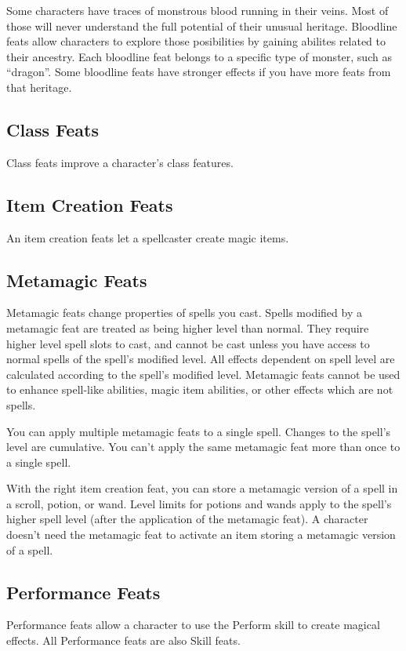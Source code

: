 Some characters have traces of monstrous blood running in their veins.
Most of those will never understand the full potential of their unusual heritage.
Bloodline feats allow characters to explore those posibilities by gaining abilites related to their ancestry.
Each bloodline feat belongs to a specific type of monster, such as ``dragon''.
Some bloodline feats have stronger effects if you have more feats from that heritage.

\subsection{Class Feats}
Class feats improve a character's class features.

\subsection{Item Creation Feats}
An item creation feats let a spellcaster create magic items.

\subsection{Metamagic Feats}
Metamagic feats change properties of spells you cast.
Spells modified by a metamagic feat are treated as being higher level than normal.
They require higher level spell slots to cast, and cannot be cast unless you have access to normal spells of the spell's modified level.
All effects dependent on spell level are calculated according to the spell's modified level.
Metamagic feats cannot be used to enhance spell-like abilities, magic item abilities, or other effects which are not spells.

You can apply multiple metamagic feats to a single spell.
Changes to the spell's level are cumulative.
You can't apply the same metamagic feat more than once to a single spell.

With the right item creation feat, you can store a metamagic version of a spell in a scroll, potion, or wand.
Level limits for potions and wands apply to the spell's higher spell level (after the application of the metamagic feat).
A character doesn't need the metamagic feat to activate an item storing a metamagic version of a spell.

\subsection{Performance Feats}
Performance feats allow a character to use the Perform skill to create magical effects.
All Performance feats are also Skill feats.

